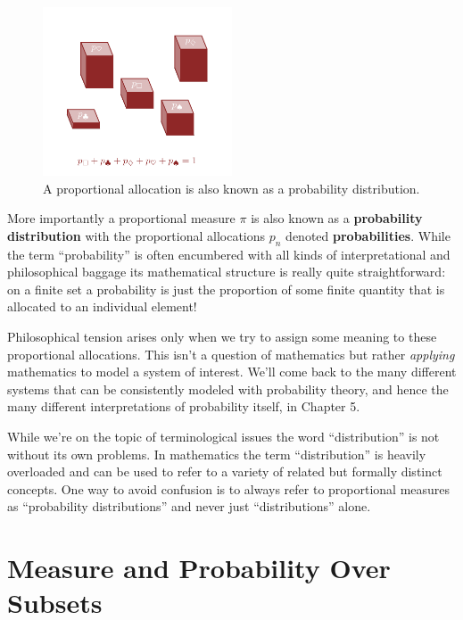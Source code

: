 \documentclass[
  letterpaper,
  DIV=11,
  numbers=noendperiod]{scrartcl}
\begin{document}
\begin{figure}

{\centering \includegraphics[width=0.5\textwidth,height=\textheight]{figures/probability_distribution/probability_distribution.pdf}

}

\caption{\label{fig-probability}A proportional allocation is also known
as a probability distribution.}

\end{figure}

More importantly a proportional measure \(\pi\) is also known as a
\textbf{probability distribution} with the proportional allocations
\(p_{n}\) denoted \textbf{probabilities}. While the term ``probability''
is often encumbered with all kinds of interpretational and philosophical
baggage its mathematical structure is really quite straightforward: on a
finite set a probability is just the proportion of some finite quantity
that is allocated to an individual element!

Philosophical tension arises only when we try to assign some meaning to
these proportional allocations. This isn't a question of mathematics but
rather \emph{applying} mathematics to model a system of interest. We'll
come back to the many different systems that can be consistently modeled
with probability theory, and hence the many different interpretations of
probability itself, in Chapter 5.

While we're on the topic of terminological issues the word
``distribution'' is not without its own problems. In mathematics the
term ``distribution'' is heavily overloaded and can be used to refer to
a variety of related but formally distinct concepts. One way to avoid
confusion is to always refer to proportional measures as ``probability
distributions'' and never just ``distributions'' alone.

\hypertarget{measure-and-probability-over-subsets}{%
\section{Measure and Probability Over
Subsets}\label{measure-and-probability-over-subsets}}
\end{document}
